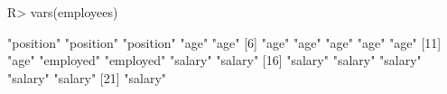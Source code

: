 \begin{Schunk}
% --begin: "lcut.vars"
\begin{Sinput}
R> vars(employees)
\end{Sinput}
\begin{Soutput}
 [1] "position" "position" "position" "age"      "age"     
 [6] "age"      "age"      "age"      "age"      "age"     
[11] "age"      "employed" "employed" "salary"   "salary"  
[16] "salary"   "salary"   "salary"   "salary"   "salary"  
[21] "salary"  
\end{Soutput}
%
% --end: "lcut.vars"
\end{Schunk}
